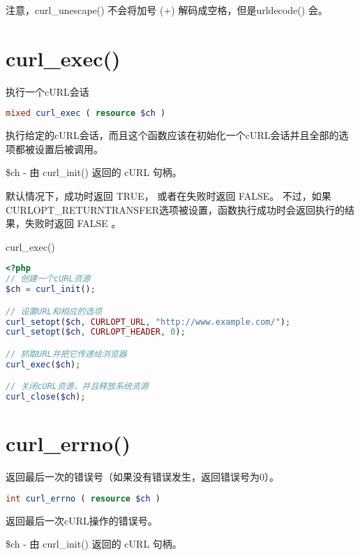注意，curl\_unescape() 不会将加号 (+) 解码成空格，但是urldecode() 会。


\section{curl\_exec()}


执行一个cURL会话


\begin{lstlisting}[language=PHP]
mixed curl_exec ( resource $ch )
\end{lstlisting}

执行给定的cURL会话，而且这个函数应该在初始化一个cURL会话并且全部的选项都被设置后被调用。

\begin{compactitem}
\item \$ch - 由 curl\_init() 返回的 cURL 句柄。
\end{compactitem}

默认情况下，成功时返回 TRUE， 或者在失败时返回 FALSE。 不过，如果 CURLOPT\_RETURNTRANSFER选项被设置，函数执行成功时会返回执行的结果，失败时返回 FALSE 。



\begin{example}
curl\_exec()
\begin{lstlisting}[language=PHP]
<?php
// 创建一个cURL资源
$ch = curl_init();

// 设置URL和相应的选项
curl_setopt($ch, CURLOPT_URL, "http://www.example.com/");
curl_setopt($ch, CURLOPT_HEADER, 0);

// 抓取URL并把它传递给浏览器
curl_exec($ch);

// 关闭cURL资源，并且释放系统资源
curl_close($ch);
\end{lstlisting}
\end{example}


\section{curl\_errno()}

返回最后一次的错误号（如果没有错误发生，返回错误号为0）。

\begin{lstlisting}[language=PHP]
int curl_errno ( resource $ch )
\end{lstlisting}

返回最后一次cURL操作的错误号。



\begin{compactitem}
\item \$ch - 由 curl\_init() 返回的 cURL 句柄。
\end{compactitem}




